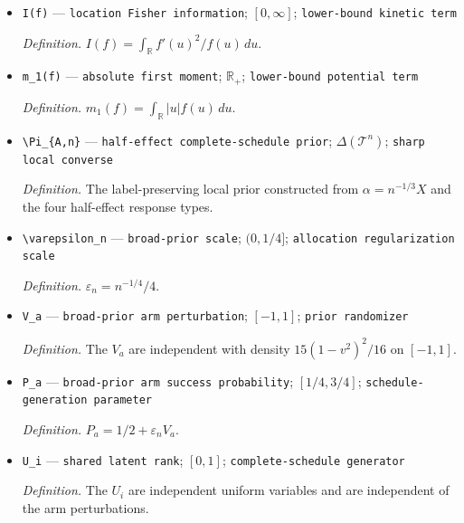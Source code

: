 \documentclass{article}
\begin{document}
\begin{itemize}
  \par\smallskip\noindent\emph{Definition.} \(p_{000}=1/2-|\alpha|+\alpha/2\), \(p_{111}=1/2-|\alpha|-\alpha/2\), \(p_{101}=p_{110}=\max(\alpha,0)\), \(p_{001}=p_{010}=\max(-\alpha,0)\), and \(p_{100}=p_{011}=0\).
  \item \texttt{I(f)} --- \texttt{location Fisher information}; \([0,\infty]\); \texttt{lower-\allowbreak{}bound kinetic term}
  \par\smallskip\noindent\emph{Definition.} \(I(f)=\int_{\mathbb R}f'(u)^2/f(u)\,du\).
  \item \texttt{m\_\allowbreak{}1(f)} --- \texttt{absolute first moment}; \(\mathbb R_+\); \texttt{lower-\allowbreak{}bound potential term}
  \par\smallskip\noindent\emph{Definition.} \(m_1(f)=\int_{\mathbb R}|u|f(u)\,du\).
  \item \texttt{\textbackslash{}\allowbreak{}Pi\_\allowbreak{}\{A,\allowbreak{}n\}\allowbreak{}} --- \texttt{half-\allowbreak{}effect complete-\allowbreak{}schedule prior}; \(\Delta(\mathcal T^n)\); \texttt{sharp local converse}
  \par\smallskip\noindent\emph{Definition.} The label-preserving local prior constructed from \(\alpha=n^{-1/3}X\) and the four half-effect response types.
  \item \texttt{\textbackslash{}\allowbreak{}varepsilon\_\allowbreak{}n} --- \texttt{broad-\allowbreak{}prior scale}; \((0,1/4]\); \texttt{allocation regularization scale}
  \par\smallskip\noindent\emph{Definition.} \(\varepsilon_n=n^{-1/4}/4\).
  \item \texttt{V\_\allowbreak{}a} --- \texttt{broad-\allowbreak{}prior arm perturbation}; \([-1,1]\); \texttt{prior randomizer}
  \par\smallskip\noindent\emph{Definition.} The \(V_a\) are independent with density \(15(1-v^2)^2/16\) on \([-1,1]\).
  \item \texttt{P\_\allowbreak{}a} --- \texttt{broad-\allowbreak{}prior arm success probability}; \([1/4,3/4]\); \texttt{schedule-\allowbreak{}generation parameter}
  \par\smallskip\noindent\emph{Definition.} \(P_a=1/2+\varepsilon_nV_a\).
  \item \texttt{U\_\allowbreak{}i} --- \texttt{shared latent rank}; \([0,1]\); \texttt{complete-\allowbreak{}schedule generator}
  \par\smallskip\noindent\emph{Definition.} The \(U_i\) are independent uniform variables and are independent of the arm perturbations.

\end{itemize}
\end{document}
